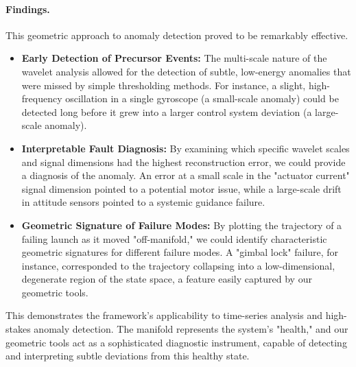 \paragraph{Findings.} This geometric approach to anomaly detection proved to be remarkably effective.
\begin{itemize}
    \item \textbf{Early Detection of Precursor Events:} The multi-scale nature of the wavelet analysis allowed for the detection of subtle, low-energy anomalies that were missed by simple thresholding methods. For instance, a slight, high-frequency oscillation in a single gyroscope (a small-scale anomaly) could be detected long before it grew into a larger control system deviation (a large-scale anomaly).
    \item \textbf{Interpretable Fault Diagnosis:} By examining which specific wavelet scales and signal dimensions had the highest reconstruction error, we could provide a diagnosis of the anomaly. An error at a small scale in the "actuator current" signal dimension pointed to a potential motor issue, while a large-scale drift in attitude sensors pointed to a systemic guidance failure.
    \item \textbf{Geometric Signature of Failure Modes:} By plotting the trajectory of a failing launch as it moved "off-manifold," we could identify characteristic geometric signatures for different failure modes. A "gimbal lock" failure, for instance, corresponded to the trajectory collapsing into a low-dimensional, degenerate region of the state space, a feature easily captured by our geometric tools.
\end{itemize}
This demonstrates the framework's applicability to time-series analysis and high-stakes anomaly detection. The manifold represents the system's "health," and our geometric tools act as a sophisticated diagnostic instrument, capable of detecting and interpreting subtle deviations from this healthy state.